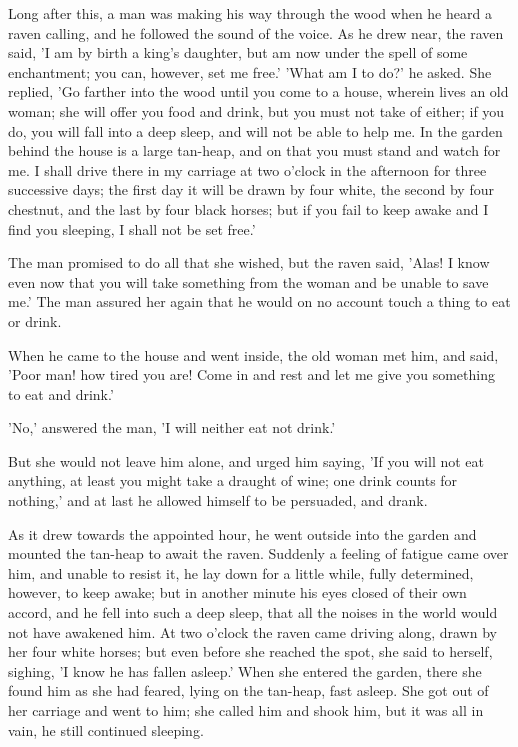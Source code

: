 \documentclass[12pt]{book}
\begin{document}
Long after this, a man was making his way through the wood when he
heard a raven calling, and he followed the sound of the voice. As he
drew near, the raven said, 'I am by birth a king's daughter, but am
now under the spell of some enchantment; you can, however, set me
free.' 'What am I to do?' he asked. She replied, 'Go farther into the
wood until you come to a house, wherein lives an old woman; she will
offer you food and drink, but you must not take of either; if you do,
you will fall into a deep sleep, and will not be able to help me. In
the garden behind the house is a large tan-heap, and on that you must
stand and watch for me. I shall drive there in my carriage at two
o'clock in the afternoon for three successive days; the first day it
will be drawn by four white, the second by four chestnut, and the last
by four black horses; but if you fail to keep awake and I find you
sleeping, I shall not be set free.'

The man promised to do all that she wished, but the raven said, 'Alas!
I know even now that you will take something from the woman and be
unable to save me.' The man assured her again that he would on no
account touch a thing to eat or drink.

When he came to the house and went inside, the old woman met him, and
said, 'Poor man! how tired you are! Come in and rest and let me give
you something to eat and drink.'

'No,' answered the man, 'I will neither eat not drink.'

But she would not leave him alone, and urged him saying, 'If you will
not eat anything, at least you might take a draught of wine; one drink
counts for nothing,' and at last he allowed himself to be persuaded,
and drank.

As it drew towards the appointed hour, he went outside into the garden
and mounted the tan-heap to await the raven. Suddenly a feeling of
fatigue came over him, and unable to resist it, he lay down for a
little while, fully determined, however, to keep awake; but in another
minute his eyes closed of their own accord, and he fell into such a
deep sleep, that all the noises in the world would not have awakened
him. At two o'clock the raven came driving along, drawn by her four
white horses; but even before she reached the spot, she said to
herself, sighing, 'I know he has fallen asleep.' When she entered the
garden, there she found him as she had feared, lying on the tan-heap,
fast asleep. She got out of her carriage and went to him; she called
him and shook him, but it was all in vain, he still continued
sleeping.
\end{document}
